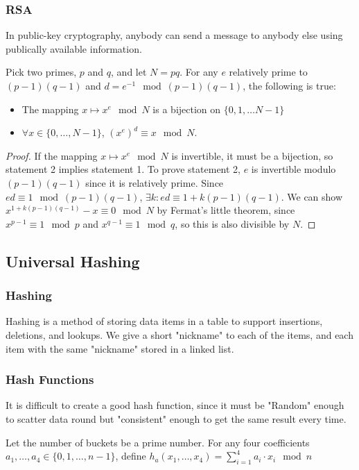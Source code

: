 \subsubsection{RSA}
  In public-key cryptography, anybody can send a message to anybody else using publically available information.

\begin{thm}
  Pick two primes, $p$ and $q$, and let $N = pq$. 
  For any $e$ relatively prime to $(p-1)(q-1)$ and $d = e^{-1} \mod (p - 1)(q - 1)$, the following is true:
  \begin{itemize}
    \item The mapping $x \mapsto x^e \mod N$ is a bijection on $\{0, 1, \dots N-1 \}$
    \item $\forall x \in \{0, \dots, N-1\}$, $(x^e)^d \equiv x \mod N$.
  \end{itemize}
\end{thm}
\begin{proof}
  If the mapping $x \mapsto x^e \mod N$ is invertible, it must be a bijection, so statement 2 implies statement 1.
  To prove statement 2, $e$ is invertible modulo $(p-1)(q-1)$ since it is relatively prime.
  Since $ed \equiv 1 \mod (p-1)(q-1)$, $\exists k: ed \equiv 1 + k(p - 1)(q - 1)$.
  We can show $x^{1 + k(p-1)(q-1)} - x \equiv 0 \mod N$ by Fermat's little theorem, since $x^{p-1} \equiv 1 \mod p$ and $x^{q-1} \equiv 1 \mod q$, so this is also divisible by $N$.
\end{proof}

\subsection{Universal Hashing}
\subsubsection{Hashing}
Hashing is a method of storing data items in a table to support insertions, deletions, and lookups.
We give a short "nickname" to each of the items, and each item with the same "nickname" stored in a linked list.

\subsubsection{Hash Functions}
It is difficult to create a good hash function, since it must be "Random" enough to scatter data round but "consistent" enough to get the same result every time.
\begin{definition}
Let the number of buckets be a prime number.
For any four coefficients $a_1, \dots, a_4 \in \{0, 1, \dots, n-1\}$, define $h_a(x_1, \dots, x_4) = \sum_{i=1}^{4} a_i \cdot x_i \mod n$
\end{definition}

